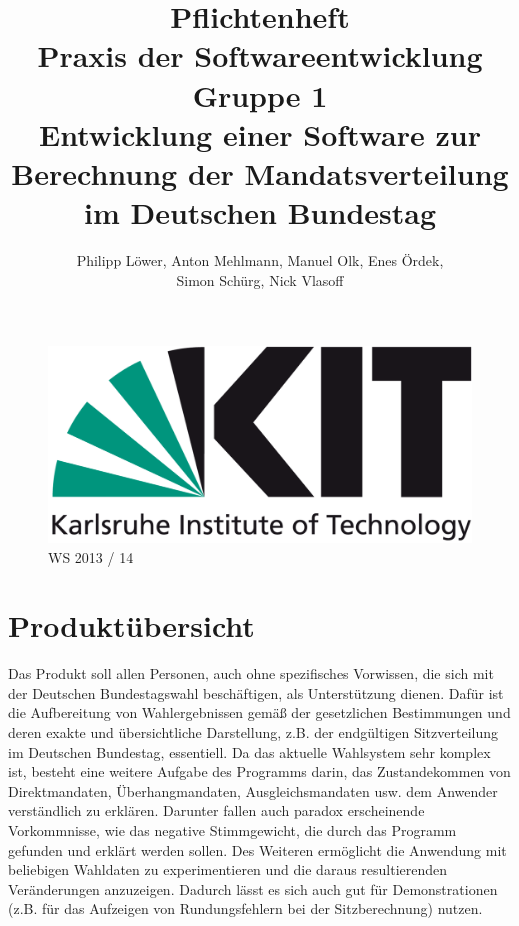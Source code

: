 \documentclass[10pt,a4paper]{article}
\title{\Huge Pflichtenheft\\[1cm] {\bfseries Praxis der Softwareentwicklung}\\Gruppe 1\\[2cm] Entwicklung einer Software zur Berechnung der Mandatsverteilung im Deutschen Bundestag\\[1cm] }
\author{Philipp Löwer, Anton Mehlmann, Manuel Olk, Enes Ördek, \\Simon Schürg, Nick Vlasoff}
\date{}
\begin{document}
\maketitle

\begin{figure}[h]

\centering
		
		\includegraphics[scale=0.6]{KIT-Logo.png}\\
		\Huge WS 2013 / 14
\end{figure}

		
\newpage
\begin{onehalfspace}
\tableofcontents
\end{onehalfspace}
\newpage 

\section{Produktübersicht}
Das Produkt soll allen Personen, auch ohne spezifisches Vorwissen, die sich mit der Deutschen Bundestagswahl beschäftigen, als Unterstützung dienen.\newline
Dafür ist die Aufbereitung von Wahlergebnissen gemäß der gesetzlichen Bestimmungen und deren exakte und übersichtliche Darstellung, z.B. der endgültigen Sitzverteilung im Deutschen Bundestag, essentiell.
Da das aktuelle Wahlsystem sehr komplex ist, besteht eine weitere Aufgabe des Programms darin, das Zustandekommen von Direktmandaten, Überhangmandaten, Ausgleichsmandaten usw. dem Anwender verständlich zu erklären.
Darunter fallen auch paradox erscheinende Vorkommnisse, wie das negative Stimmgewicht, die durch das Programm gefunden und erklärt werden sollen. \newline
Des Weiteren ermöglicht die Anwendung mit beliebigen Wahldaten zu experimentieren und die daraus resultierenden Veränderungen anzuzeigen. Dadurch lässt es sich auch gut für Demonstrationen (z.B. für das Aufzeigen von Rundungsfehlern bei der Sitzberechnung) nutzen.
\end{document}
